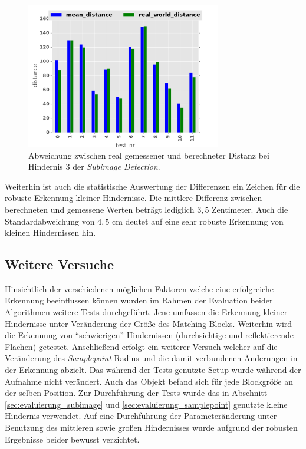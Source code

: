 \begin{figure}[h]
	\centering
	\includegraphics[width=8.5cm]{img/evaluation/diagrams/sample_tiny_bar}
	\caption{Abweichung zwischen real gemessener und berechneter Distanz bei Hindernis 3 der \emph{Subimage Detection}.}
    \label{fig:sample_eval_tiny}
\end{figure}

\noindent
Weiterhin ist auch die statistische Auswertung der Differenzen ein Zeichen für die robuste Erkennung kleiner Hindernisse. Die mittlere Differenz zwischen berechneten und gemessene Werten beträgt lediglich $3,5$ Zentimeter. Auch die Standardabweichung von $4,5$ cm deutet auf eine sehr robuste Erkennung von kleinen Hindernissen hin.

\subsection{Weitere Versuche}
\label{sec:further_tests}

Hinsichtlich der verschiedenen möglichen Faktoren welche eine erfolgreiche Erkennung beeinflussen können wurden im Rahmen der Evaluation beider Algorithmen weitere Tests durchgeführt. Jene umfassen die Erkennung kleiner Hindernisse unter Veränderung der Größe des Matching-Blocks. Weiterhin wird die Erkennung von \enquote{schwierigen} Hindernissen (durchsichtige und  reflektierende Flächen) getestet. Anschließend erfolgt ein weiterer Versuch welcher auf die Veränderung des \emph{Samplepoint} Radius und die damit verbundenen Änderungen in der Erkennung abzielt. Das während der Tests genutzte Setup wurde während der Aufnahme nicht verändert. Auch das Objekt befand sich für jede Blockgröße an der selben Position. Zur Durchführung der Tests wurde das in Abschnitt \ref{sec:evaluierung_subimage} und \ref{sec:evaluierung_samplepoint} genutzte kleine Hindernis verwendet. Auf eine Durchführung der Parameteränderung unter Benutzung des mittleren sowie großen Hindernisses wurde aufgrund der robusten Ergebnisse beider bewusst verzichtet.\\

